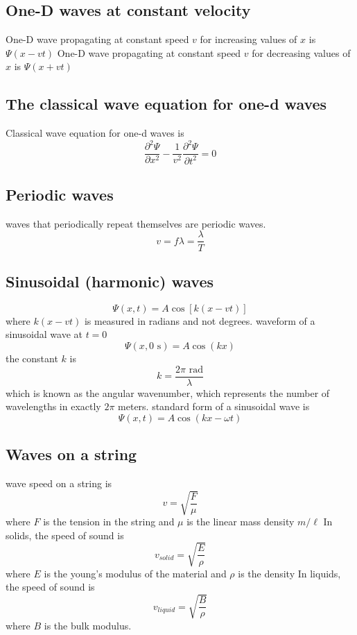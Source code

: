 \documentclass[twocolumn]{article}
\begin{document}
\subsection{One-D waves at constant velocity}
\begin{outline}
    \1 One-D wave propagating at constant speed $v$ for increasing values of $x$ is \(\Psi(x-vt)\)
    \1 One-D wave propagating at constant speed $v$ for decreasing values of $x$ is \(\Psi(x+vt)\)
\end{outline}
\subsection{The classical wave equation for one-d waves}
\begin{outline}
    \1 Classical wave equation for one-d waves is \[\dfrac{\partial^2\Psi}{\partial x^2}-\dfrac{1}{v^2}\dfrac{\partial^2\Psi}{\partial t^2}=0\]
\end{outline}
\subsection{Periodic waves}
\begin{outline}
    \1 waves that periodically repeat themselves are periodic waves. 
\0 \[v=f\lambda=\dfrac{\lambda}{T}\]
\end{outline}
\subsection{Sinusoidal (harmonic) waves}
\begin{outline}
\0 \[\Psi(x,t)=A\cos\left[k(x-vt)\right]\] where \(k(x-vt)\) is measured in radians and not degrees.
    \1 waveform of a sinusoidal wave at $t=0$ \[\Psi(x,0\text{ s})=A\cos(kx)\]
    \1 the constant $k$ is \[k=\dfrac{2\pi\text{ rad}}{\lambda}\] which is known as the angular wavenumber, which represents the number of wavelengths in exactly $2\pi$ meters. 
    \1 standard form of a sinusoidal wave is \[\Psi(x,t)=A\cos(kx-\omega t)\]
\end{outline}
\subsection{Waves on a string}
\begin{outline}
    \1 wave speed on a string is \[v=\sqrt{\dfrac{F}{\mu}}\] where $F$ is the tension in the string and $\mu$ is the linear mass density $m/\ell$
    \1 In solids, the speed of sound is \[v_{solid}=\sqrt{\dfrac{E}{\rho}}\] where $E$ is the young's modulus of the material and $\rho$ is the density
    \1 In liquids, the speed of sound is \[v_{liquid}=\sqrt{\dfrac{B}{\rho}}\] where $B$ is the bulk modulus. 
\end{outline}
\end{document}
